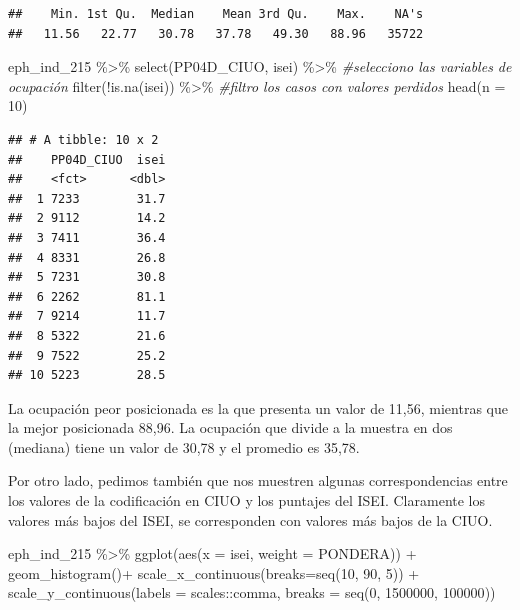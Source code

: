 \documentclass[
]{book}
\newenvironment{Shaded}{\begin{snugshade}}{\end{snugshade}}
\newcommand{\AttributeTok}[1]{\textcolor[rgb]{0.77,0.63,0.00}{#1}}
\newcommand{\CommentTok}[1]{\textcolor[rgb]{0.56,0.35,0.01}{\textit{#1}}}
\newcommand{\DecValTok}[1]{\textcolor[rgb]{0.00,0.00,0.81}{#1}}
\newcommand{\FunctionTok}[1]{\textcolor[rgb]{0.00,0.00,0.00}{#1}}
\newcommand{\NormalTok}[1]{#1}
\newcommand{\SpecialCharTok}[1]{\textcolor[rgb]{0.00,0.00,0.00}{#1}}
\begin{document}
\begin{verbatim}
##    Min. 1st Qu.  Median    Mean 3rd Qu.    Max.    NA's 
##   11.56   22.77   30.78   37.78   49.30   88.96   35722
\end{verbatim}

\begin{Shaded}
\begin{Highlighting}[]
\NormalTok{eph\_ind\_215 }\SpecialCharTok{\%\textgreater{}\%} 
    \FunctionTok{select}\NormalTok{(PP04D\_CIUO, isei) }\SpecialCharTok{\%\textgreater{}\%} \CommentTok{\#selecciono las variables de ocupación}
    \FunctionTok{filter}\NormalTok{(}\SpecialCharTok{!}\FunctionTok{is.na}\NormalTok{(isei)) }\SpecialCharTok{\%\textgreater{}\%}  \CommentTok{\#filtro los casos con valores perdidos}
    \FunctionTok{head}\NormalTok{(}\AttributeTok{n =} \DecValTok{10}\NormalTok{)}
\end{Highlighting}
\end{Shaded}

\begin{verbatim}
## # A tibble: 10 x 2
##    PP04D_CIUO  isei
##    <fct>      <dbl>
##  1 7233        31.7
##  2 9112        14.2
##  3 7411        36.4
##  4 8331        26.8
##  5 7231        30.8
##  6 2262        81.1
##  7 9214        11.7
##  8 5322        21.6
##  9 7522        25.2
## 10 5223        28.5
\end{verbatim}

La ocupación peor posicionada es la que presenta un valor de 11,56, mientras que la mejor posicionada 88,96. La ocupación que divide a la muestra en dos (mediana) tiene un valor de 30,78 y el promedio es 35,78.

Por otro lado, pedimos también que nos muestren algunas correspondencias entre los valores de la codificación en CIUO y los puntajes del ISEI. Claramente los valores más bajos del ISEI, se corresponden con valores más bajos de la CIUO.

\begin{Shaded}
\begin{Highlighting}[]
\NormalTok{eph\_ind\_215 }\SpecialCharTok{\%\textgreater{}\%} 
    \FunctionTok{ggplot}\NormalTok{(}\FunctionTok{aes}\NormalTok{(}\AttributeTok{x =}\NormalTok{ isei, }\AttributeTok{weight =}\NormalTok{ PONDERA)) }\SpecialCharTok{+} 
    \FunctionTok{geom\_histogram}\NormalTok{()}\SpecialCharTok{+}
    \FunctionTok{scale\_x\_continuous}\NormalTok{(}\AttributeTok{breaks=}\FunctionTok{seq}\NormalTok{(}\DecValTok{10}\NormalTok{, }\DecValTok{90}\NormalTok{, }\DecValTok{5}\NormalTok{)) }\SpecialCharTok{+}
    \FunctionTok{scale\_y\_continuous}\NormalTok{(}\AttributeTok{labels =}\NormalTok{ scales}\SpecialCharTok{::}\NormalTok{comma, }\AttributeTok{breaks =} \FunctionTok{seq}\NormalTok{(}\DecValTok{0}\NormalTok{, }\DecValTok{1500000}\NormalTok{, }\DecValTok{100000}\NormalTok{))}
\end{Highlighting}
\end{Shaded}
\end{document}
